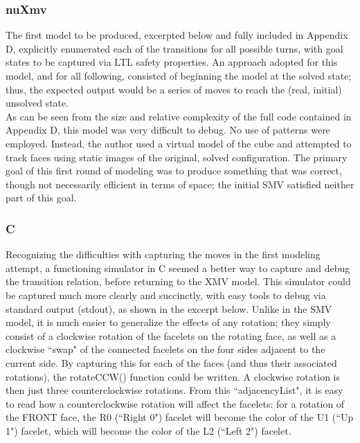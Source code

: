 \documentclass{article}
\begin{document}
\subsubsection {nuXmv}
The first model to be produced, excerpted below and fully included in Appendix D, explicitly enumerated each of the transitions for all possible turns, with goal states to be captured via LTL safety properties. An approach adopted for this model, and for all following, consisted of beginning the model at the solved state; thus, the expected output would be a series of moves to reach the (real, initial) unsolved state.\\

\noindent As can be seen from the size and relative complexity of the full code contained in Appendix D, this model was very difficult to debug. No use of patterns were employed. Instead, the author used a virtual model of the cube and attempted to track faces using static images of the original, solved configuration. The primary goal of this first round of modeling was to produce something that was correct, though not necessarily efficient in terms of space; the initial SMV satisfied neither part of this goal.

\vspace{0.3cm}


\subsubsection {C}
Recognizing the difficulties with capturing the moves in the first modeling attempt, a functioning simulator in C seemed a better way to capture and debug the transition relation, before returning to the XMV model. This simulator could be captured much more clearly and succinctly, with easy tools to debug via standard output (stdout), as shown in the excerpt below. Unlike in the SMV model, it is much easier to generalize the effects of any rotation; they simply consist of a clockwise rotation of the facelets on the rotating face, as well as a clockwise ``swap" of the connected facelets on the four sides adjacent to the current side. By capturing this for each of the faces (and thus their associated rotations), the rotateCCW() function could be written. A clockwise rotation is then just three counterclockwise rotations. From this ``adjacencyList", it is easy to read how a counterclockwise rotation will affect the facelets: for a rotation of the FRONT face, the R0 (``Right 0") facelet will become the color of the U1 (``Up 1") facelet, which will become the color of the L2 (``Left 2") facelet.
\end{document}
